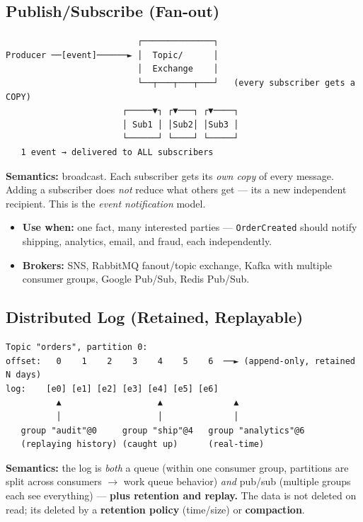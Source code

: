 \documentclass[11pt]{article}
\providecommand{\tightlist}{\setlength{\itemsep}{1pt}\setlength{\parskip}{0pt}}
\begin{document}
\subsection{Publish/Subscribe (Fan-out)}\label{publishsubscribe-fan-out}

\setcodelang{}

\begin{verbatim}
                          ┌──────────────┐
Producer ──[event]──────► │  Topic/      │
                          │  Exchange    │
                          └──┬───┬───┬───┘   (every subscriber gets a COPY)
                       ┌─────▼┐ ┌▼───┐ ┌▼────┐
                       │ Sub1 │ │Sub2│ │Sub3 │
                       └──────┘ └────┘ └─────┘
   1 event → delivered to ALL subscribers
\end{verbatim}

\textbf{Semantics:} broadcast. Each subscriber gets its \emph{own copy} of every message. Adding a subscriber does \emph{not} reduce what others get --- it\textquotesingle s a new independent recipient. This is the \emph{event notification} model.

\begin{itemize}
\tightlist
\item
  \textbf{Use when:} one fact, many interested parties --- \texttt{OrderCreated} should notify shipping, analytics, email, and fraud, each independently.
\item
  \textbf{Brokers:} SNS, RabbitMQ fanout/topic exchange, Kafka with multiple consumer groups, Google Pub/Sub, Redis Pub/Sub.
\end{itemize}

\subsection{Distributed Log (Retained, Replayable)}\label{distributed-log-retained-replayable}

\setcodelang{}

\begin{verbatim}
Topic "orders", partition 0:
offset:   0    1    2    3    4    5    6  ──► (append-only, retained N days)
log:    [e0] [e1] [e2] [e3] [e4] [e5] [e6]
          ▲                   ▲              ▲
          │                   │              │
   group "audit"@0     group "ship"@4   group "analytics"@6
   (replaying history) (caught up)      (real-time)
\end{verbatim}

\textbf{Semantics:} the log is \emph{both} a queue (within one consumer group, partitions are split across consumers \(\rightarrow\) work queue behavior) \emph{and} pub/sub (multiple groups each see everything) --- \textbf{plus retention and replay.} The data is not deleted on read; it\textquotesingle s deleted by a \textbf{retention policy} (time/size) or \textbf{compaction}.
\end{document}
